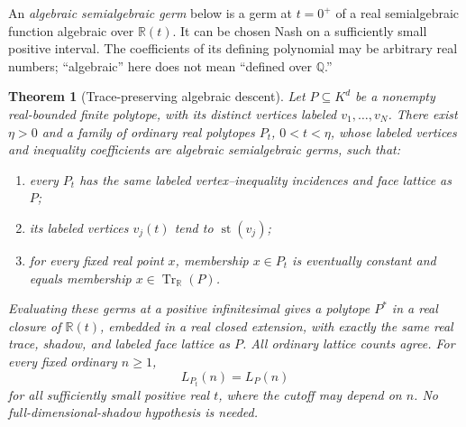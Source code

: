 \documentclass[11pt,a4paper]{article}
\numberwithin{equation}{section}
\newtheorem{theorem}{Theorem}[section]
\theoremstyle{plain}
\newcommand{\R}{\mathbb R}
\newcommand{\Q}{\mathbb Q}
\newcommand{\st}{\operatorname{st}}
\newcommand{\Tr}{\operatorname{Tr}_{\R}}%
\newcommand{\tr}{\operatorname{tr}}%
\begin{document}
An \emph{algebraic semialgebraic germ} below is a germ at $t=0^+$ of a real
semialgebraic function algebraic over $\R(t)$. It can be chosen Nash on a
sufficiently small positive interval. The coefficients of its defining
polynomial may be arbitrary real numbers; ``algebraic'' here does not mean
``defined over $\Q$.''

\begin{theorem}[Trace-preserving algebraic descent]\label{poly:ehr:thm:descent}
Let $P\subseteq K^d$ be a nonempty real-bounded finite polytope, with its
distinct vertices labeled $v_1,\ldots,v_N$. There exist $\eta>0$ and a family
of ordinary real polytopes $P_t$, $0<t<\eta$, whose labeled vertices and
inequality coefficients are algebraic semialgebraic germs, such that:
\begin{enumerate}[label=(\roman*)]
\item every $P_t$ has the same labeled vertex--inequality incidences and face
      lattice as $P$;
\item its labeled vertices $v_j(t)$ tend to $\st(v_j)$;
\item for every fixed real point $x$, membership $x\in P_t$ is eventually
      constant and equals membership $x\in\Tr(P)$.
\end{enumerate}
Evaluating these germs at a positive infinitesimal gives a polytope $P^*$
in a real closure of $\R(t)$, embedded in a real closed extension, with
exactly the same real trace, shadow, and labeled face lattice as $P$.
All ordinary lattice counts agree. For every fixed ordinary $n\geq1$,
\[
 L_{P_t}(n)=L_P(n)
\]
for all sufficiently small positive real $t$, where the cutoff may depend
on $n$. No full-dimensional-shadow hypothesis is needed.
\end{theorem}
\end{document}
